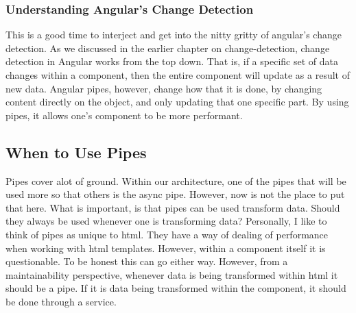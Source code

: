\subsubsection{ Understanding Angular's Change Detection }
This is a good time to interject and get into the nitty gritty of angular's
change detection. As we discussed in the earlier chapter on change-detection,
change detection in Angular works from the top down. That is, if a specific set
of data changes within a component, then the entire component will update as a
result of new data. Angular pipes, however, change how that it is done, by
changing content directly on the object, and only updating that one specific
part. By using pipes, it allows one's component to be more performant.

\subsection{ When to Use Pipes }
Pipes cover alot of ground. Within our architecture, one of the pipes that will
be used more so that others is the async pipe. However, now is not the place
to put that here. What is important, is that pipes can be used transform data.
Should they always be used whenever one is transforming data? Personally,
I like to think of pipes as unique to html. They have a way of dealing of
performance when working with html templates. However, within a component
itself it is questionable. To be honest this can go either way. However, from a
maintainability perspective, whenever data is being transformed within html it
should be a pipe. If it is data being transformed within the component, it
should be done through a service.

